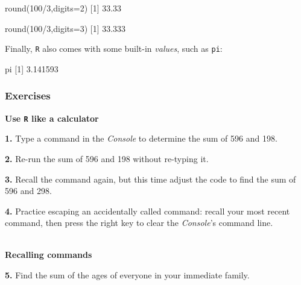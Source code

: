 \documentclass[
]{book}
\newenvironment{Shaded}{\begin{snugshade}}{\end{snugshade}}
\newcommand{\AttributeTok}[1]{\textcolor[rgb]{0.77,0.63,0.00}{#1}}
\newcommand{\DecValTok}[1]{\textcolor[rgb]{0.00,0.00,0.81}{#1}}
\newcommand{\FloatTok}[1]{\textcolor[rgb]{0.00,0.00,0.81}{#1}}
\newcommand{\FunctionTok}[1]{\textcolor[rgb]{0.00,0.00,0.00}{#1}}
\newcommand{\NormalTok}[1]{#1}
\newcommand{\SpecialCharTok}[1]{\textcolor[rgb]{0.00,0.00,0.00}{#1}}
\begin{document}
\begin{Shaded}
\begin{Highlighting}[]
\FunctionTok{round}\NormalTok{(}\DecValTok{100}\SpecialCharTok{/}\DecValTok{3}\NormalTok{,}\AttributeTok{digits=}\DecValTok{2}\NormalTok{)}
\NormalTok{[}\DecValTok{1}\NormalTok{] }\FloatTok{33.33}
\end{Highlighting}
\end{Shaded}

\begin{Shaded}
\begin{Highlighting}[]
\FunctionTok{round}\NormalTok{(}\DecValTok{100}\SpecialCharTok{/}\DecValTok{3}\NormalTok{,}\AttributeTok{digits=}\DecValTok{3}\NormalTok{)}
\NormalTok{[}\DecValTok{1}\NormalTok{] }\FloatTok{33.333}
\end{Highlighting}
\end{Shaded}

Finally, \texttt{R} also comes with some built-in \emph{values}, such as \texttt{pi}:

\begin{Shaded}
\begin{Highlighting}[]
\NormalTok{pi}
\NormalTok{[}\DecValTok{1}\NormalTok{] }\FloatTok{3.141593}
\end{Highlighting}
\end{Shaded}

\hypertarget{exercises}{%
\subsubsection*{Exercises}\label{exercises}}

\textbf{Use \texttt{R} like a calculator}

\textbf{1.} Type a command in the \emph{Console} to determine the sum of 596 and 198.

\textbf{2.} Re-run the sum of 596 and 198 without re-typing it.

\textbf{3.} Recall the command again, but this time adjust the code to find the sum of 596 and 298.

\textbf{4.} Practice escaping an accidentally called command: recall your most recent command, then press the right key to clear the \emph{Console}'s command line.

~\\
\textbf{Recalling commands}

\textbf{5.} Find the sum of the ages of everyone in your immediate family.
\end{document}
